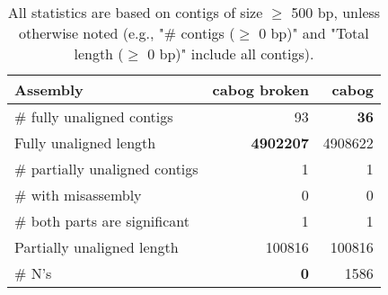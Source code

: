 \documentclass[12pt,a4paper]{article}
\begin{document}
\begin{table}[ht]
\begin{center}
\caption{All statistics are based on contigs of size $\geq$ 500 bp, unless otherwise noted (e.g., "\# contigs ($\geq$ 0 bp)" and "Total length ($\geq$ 0 bp)" include all contigs).}
\begin{tabular}{|l*{2}{|r}|}
\hline
Assembly & cabog broken & cabog \\ \hline
\# fully unaligned contigs & 93 & {\bf 36} \\ \hline
Fully unaligned length & {\bf 4902207} & 4908622 \\ \hline
\# partially unaligned contigs & 1 & 1 \\ \hline
\hspace{5mm}\# with misassembly & 0 & 0 \\ \hline
\hspace{5mm}\# both parts are significant & 1 & 1 \\ \hline
Partially unaligned length & 100816 & 100816 \\ \hline
\# N's & {\bf 0} & 1586 \\ \hline
\end{tabular}
\end{center}
\end{table}
\end{document}
